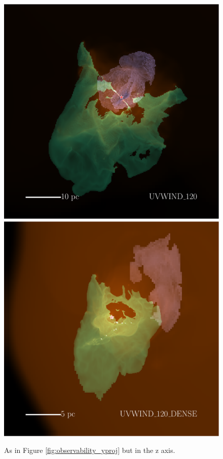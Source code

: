 \documentclass[a4paper,fleqn,usenatbib]{mnras}
\begin{document}
\begin{figure}
	\includegraphics[width=1\columnwidth]{../plots/vis/multiray/multirayTime_coolemission_ionemission_xrayemission2__windset_120Msun0p2Myr_zoom0p5__zwindonly.pdf} \includegraphics[width=1\columnwidth]{../plots/vis/multiray/multirayTime_coolemission_ionemission_xrayemission2__windset_120Msun_dense0p2Myr_zoom1p0__zwindonly.pdf}
	\caption{As in Figure \ref{fig:observability_yproj} but in the z axis.}
	\label{fig:observability_zproj}
\end{figure}



\bsp	%
\label{lastpage}
\end{document}
